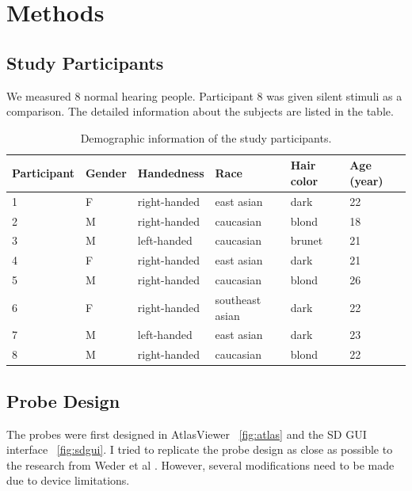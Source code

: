 \chapter{Methods}
\section {Study Participants}
We measured 8 normal hearing people. Participant 8 was given silent stimuli as a comparison. The detailed information about the subjects are listed in the table.

\begin{table}[h!]
  \begin{center}
    
    
    \begin{tabular}{p{2.3cm} | p{1.5cm} |p{2.5cm} | p{2.8cm} | p{2.1cm} | p{2.2cm}} %
      \textbf{Participant} & \textbf {Gender}& \textbf{Handedness} & \textbf{Race} & \textbf{Hair color} &\textbf {Age (year)}\\ 
      \hline
      1 & F & right-handed & east asian & dark & 22\\
      2 & M & right-handed  & caucasian & blond & 18 \\
      3 & M & left-handed &  caucasian & brunet & 21\\
      4 & F  & right-handed & east asian & dark& 21 \\
      5 & M & right-handed  &  caucasian& blond & 26 \\
      6 &  F & right-handed & southeast asian & dark & 22 \\
      7 &  M & left-handed &  east asian & dark & 23 \\
      8 & M & right-handed  & caucasian & blond & 22 \\
    \end{tabular}
    \label{tab:table1}
    \caption{Demographic information of the study participants.}
  \end{center}
  
\end{table}

\section {Probe Design}
The probes were first designed in AtlasViewer ~\ref{fig:atlas} \cite {10.1117/1.NPh.2.2.020801} and the SD GUI interface ~\ref{fig:sdgui}. I tried to replicate the probe design as close as possible to the research from Weder et al \citeyear{Weder2018}. However, several modifications need to be made due to device limitations.

